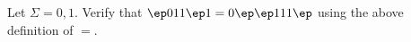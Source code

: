 Let $\Sigma = {0,1}$. Verify that $\ep 011 \ep 1 = 0 \ep\ep 111
\ep$ using the above definition of $=$.
